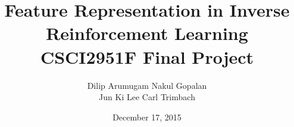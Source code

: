 \documentclass{article}
\title{
 Feature Representation in Inverse Reinforcement Learning\\
  CSCI2951F Final Project
  }
\author{
  Dilip Arumugam \hspace{10mm}
  Nakul Gopalan\\
  Jun Ki Lee \hspace{20mm}
  Carl Trimbach\\
  }
\date{December 17, 2015}
\begin{document}
\maketitle

\pagebreak









\footnotesize


\end{document}
